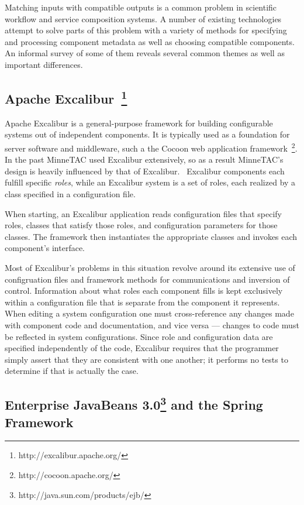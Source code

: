 \documentclass{elsart}
\begin{document}
Matching inputs with compatible outputs is a common problem in scientific workflow and service composition systems.  A number of existing technologies attempt to solve parts of this problem with a variety of methods for specifying and processing component metadata as well as choosing compatible components.  An informal survey of some of them reveals several common themes as well as important differences.

\subsection{Apache Excalibur~\footnote{http://excalibur.apache.org/}}

Apache Excalibur is a general-purpose framework for building configurable systems out of independent components.  It is typically used as a foundation for server software and middleware, such a the Cocoon web application framework~\footnote{http://cocoon.apache.org/}.  In the past MinneTAC used Excalibur extensively, so as a result MinneTAC's design is heavily influenced by that of Excalibur.~\cite{ecra07}   Excalibur components each fulfill specific \emph{roles}, while an Excalibur system is a set of roles, each realized by a class specified in a configuration file.

When starting, an Excalibur application reads configuration files that specify roles, classes that satisfy those roles, and configuration parameters for those classes.  The framework then instantiates the appropriate classes and invokes each component's interface.

Most of Excalibur's problems in this situation revolve around its extensive use of configruation files and framework methods for communications and inversion of control.  Information about what roles each component fills is kept exclusively within a configuration file that is separate from the component it represents.  When editing a system configuration one must cross-reference any changes made with component code and documentation, and vice versa --- changes to code must be reflected in system configurations.
Since role and configuration data are specified independently of the code, Excalibur requires that the programmer simply assert that they are consistent with one another; it performs no tests to determine if that is actually the case.

\subsection{Enterprise JavaBeans 3.0\footnote{http://java.sun.com/products/ejb/} and the Spring Framework~\cite{http://www.springsource.org/}}
\end{document}
